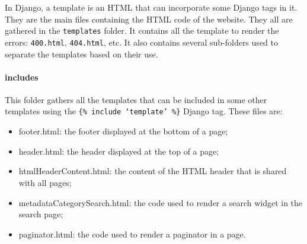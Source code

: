 \documentclass{report}
\begin{document}
	In Django, a template is an HTML that can incorporate some Django tags in it. They are the main files containing the HTML code of the website. They all are gathered in the \texttt{templates} folder. It contains all the template to render the errors: \texttt{400.html}, \texttt{404.html}, etc. It also contains several sub-folders used to separate the templates based on their use.
	
	\paragraph*{\faFolderO{} includes} This folder gathers all the templates that can be included in some other templates using the \texttt{\{\% include `template' \%\}} Django tag. These files are:
	\begin{itemize}
		\item[\faFileO] footer.html: the footer displayed at the bottom of a page;
		\item[\faFileO] header.html: the header displayed at the top of a page;
		\item[\faFileO] htmlHeaderContent.html: the content of the HTML header that is shared with all pages;
		\item[\faFileO] metadataCategorySearch.html: the code used to render a search widget in the search page;
		\item[\faFileO] paginator.html: the code used to render a paginator in a page.
	\end{itemize}
	
\end{document}
